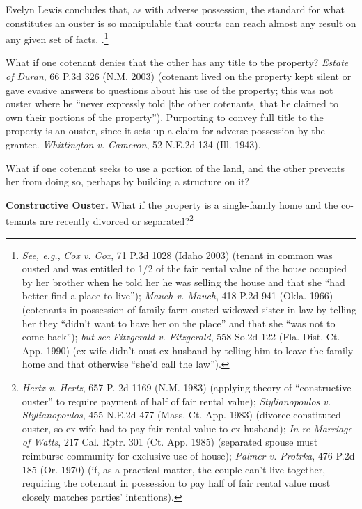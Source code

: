 Evelyn Lewis concludes that, as with adverse possession, the standard for what
constitutes an ouster is so manipulable that courts can reach almost any result
on any given set of facts. .\footnote{\emph{See, e.g.}, \emph{Cox v. Cox}, 71
P.3d 1028 (Idaho 2003) (tenant in common was ousted and was entitled to 1/2 of
the fair rental value of the house occupied by her brother when he told her he
was selling the house and that she ``had better find a place to live'');
\emph{Mauch v. Mauch}, 418 P.2d 941 (Okla. 1966) (cotenants in possession of
family farm ousted widowed sister-in-law by telling her they ``didn't want to
have her on the place'' and that she ``was not to come back''); \emph{but see}
\emph{Fitzgerald v. Fitzgerald}, 558 So.2d 122 (Fla. Dist. Ct. App. 1990)
(ex-wife didn't oust ex-husband by telling him to leave the family home and that
otherwise ``she'd call the law'').}


What if one cotenant denies that the other has any title to the property?
\emph{Estate of Duran}, 66 P.3d 326 (N.M. 2003) (cotenant lived on the property
kept silent or gave evasive answers to questions about his use of the property;
this was not ouster where he ``never expressly told [the other cotenants] that
he claimed to own their portions of the property''). Purporting to convey full
title to the property is an ouster, since it sets up a claim for adverse
possession by the grantee. \emph{Whittington v. Cameron}, 52 N.E.2d 134 (Ill.
1943).




What if one cotenant seeks to use a portion of the land, and the other prevents
her from doing so, perhaps by building a structure on it?



\item \textbf{Constructive Ouster.} What if the property is a single-family home
and the co-tenants are recently divorced or separated?\footnote{\emph{Hertz v.
Hertz}, 657 P. 2d 1169 (N.M. 1983) (applying theory of ``constructive ouster''
to require payment of half of fair rental value); \emph{Stylianopoulos v.
Stylianopoulos}, 455 N.E.2d 477 (Mass. Ct. App. 1983) (divorce constituted
ouster, so ex-wife had to pay fair rental value to ex-husband); \emph{In re
Marriage of Watts}, 217 Cal. Rptr. 301 (Ct. App. 1985) (separated spouse must
reimburse community for exclusive use of house); \emph{Palmer v. Protrka}, 476
P.2d 185 (Or. 1970) (if, as a practical matter, the couple can't live together,
requiring the cotenant in possession to pay half of fair rental value most
closely matches parties' intentions).}


